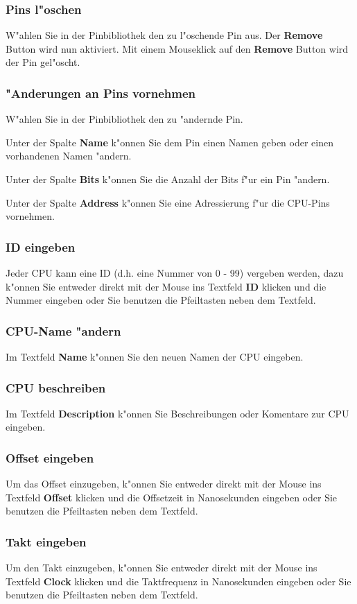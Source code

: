 \documentclass[a4paper,titlepage,12pt,ngerman]{scrbook}
\begin{document}
\subsubsection{Pins l"oschen}
W"ahlen Sie in der Pinbibliothek den zu l"oschende Pin aus. Der {\bf Remove} Button wird nun aktiviert. Mit einem Mouseklick auf den {\bf Remove} Button wird der Pin gel"oscht.
\subsubsection{"Anderungen an Pins vornehmen}
W"ahlen Sie in der Pinbibliothek den zu "andernde Pin.\par
Unter der Spalte {\bf Name} k"onnen Sie dem Pin einen Namen geben oder einen vorhandenen Namen "andern.\par
Unter der Spalte {\bf Bits} k"onnen Sie die Anzahl der Bits f"ur ein Pin "andern.\par
Unter der Spalte {\bf Address} k"onnen Sie eine Adressierung f"ur die CPU-Pins vornehmen.\par
\subsubsection{ID eingeben}
Jeder CPU kann eine ID (d.h. eine Nummer von 0 - 99) vergeben werden, dazu k"onnen Sie entweder direkt mit der Mouse ins Textfeld {\bf ID} klicken und die Nummer eingeben oder Sie benutzen die Pfeiltasten neben dem Textfeld.
\subsubsection{CPU-Name "andern}
Im Textfeld {\bf Name} k"onnen Sie den neuen Namen der CPU eingeben.
\subsubsection{CPU beschreiben}
Im Textfeld {\bf Description} k"onnen Sie Beschreibungen oder Komentare zur CPU eingeben.
\subsubsection{Offset eingeben}
Um das Offset einzugeben, k"onnen Sie entweder direkt mit der Mouse ins Textfeld {\bf Offset} klicken und die Offsetzeit in Nanosekunden eingeben oder Sie benutzen die Pfeiltasten neben dem Textfeld. 
\subsubsection{Takt eingeben}
Um den Takt einzugeben, k"onnen Sie entweder direkt mit der Mouse ins Textfeld {\bf Clock} klicken und die Taktfrequenz in Nanosekunden eingeben oder Sie benutzen die Pfeiltasten neben dem Textfeld. 
\end{document}
